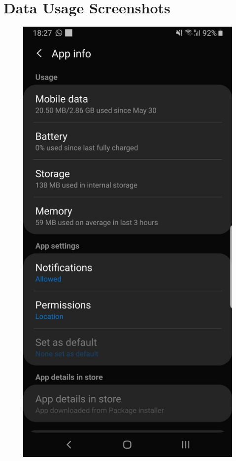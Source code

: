 \chapter{Data Usage Screenshots}
\begin{figure}
	\centering
	\begin{minipage}{.45\textwidth}
		\begin{center}
		\includegraphics[width=\textwidth]{data/data-usage/data-usage1.jpeg}

\end{center}
\end{minipage}
\end{figure}
